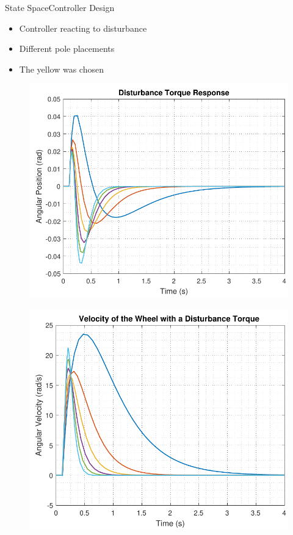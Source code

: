 \begin{frame}{State Space}{Controller Design}
  \begin{itemize}
    \item Controller reacting to disturbance
    \item Different pole placements
    \item The yellow was chosen
  \end{itemize}
  \vspace{.5cm}
  \hspace{0.03\linewidth}
  \begin{minipage}{\linewidth}
   	\begin{minipage}{0.45\linewidth}
   		\begin{figure}[H]
   			\includegraphics[scale=.35]{Pictures/disturbanceStateSpace}
   			\centering
   		\end{figure}
   	\end{minipage}
   	\hspace{0.03\linewidth}
   	\begin{minipage}{0.45\linewidth}
   		\begin{figure}[H]
   			\includegraphics[scale=.35]{Pictures/disturbanceStateSpaceWheel}

\end{figure}
\end{minipage}
\end{minipage}
\end{frame}
